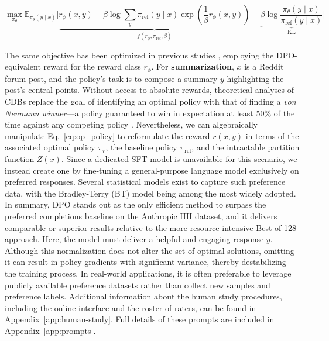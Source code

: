 \begin{equation}\label{eq:AC}
    \max_{\pi_{\theta}}\mathbb{E}_{\pi_{\theta}(y\mid x)}\bigg[\underbrace{r_{\phi}(x, y) -\beta\log\sum_{y}\pi_\text{ref}(y\mid x)\exp\left(\frac{1}{\beta}r_{\phi}(x, y)\right)}_{f(r_{\phi}, \pi_\text{ref}, \beta)} - \underbrace{\beta\log\frac{\pi_{\theta}(y\mid x)}{\pi_\text{ref}(y\mid x)}}_{\text{KL}}\bigg]
\end{equation}

The same objective has been optimized in previous studies 
\citep{ziegler2020finetuning, stiennon2022learning, bai2022training, ouyang2022training}, employing the DPO-equivalent reward for the reward class $r_{\phi}$. For \textbf{summarization}, $x$ is a Reddit forum post, and the policy's task is to compose a summary $y$ highlighting the post’s central points. Without access to absolute rewards, theoretical analyses of CDBs replace the goal of identifying an optimal policy with that of finding a \textit{von Neumann winner}—a policy guaranteed to win in expectation at least 50\% of the time against any competing policy \citep{dudik2015contextual}. Nevertheless, we can algebraically manipulate Eq.~\ref{eq:op_policy} to reformulate the reward $r(x, y)$ in terms of the associated optimal policy $\pi_r$, the baseline policy $\pi_\text{ref}$, and the intractable partition function $Z(x)$. Since a dedicated SFT model is unavailable for this scenario, we instead create one by fine-tuning a general-purpose language model exclusively on preferred responses. Several statistical models exist to capture such preference data, with the Bradley-Terry (BT) model \cite{bradley1952rankanalysis} being among the most widely adopted. In summary, DPO stands out as the only efficient method to surpass the preferred completions baseline on the Anthropic HH dataset, and it delivers comparable or superior results relative to the more resource-intensive Best of 128 approach. Here, the model must deliver a helpful and engaging response $y$. Although this normalization does not alter the set of optimal solutions, omitting it can result in policy gradients with significant variance, thereby destabilizing the training process. In real-world applications, it is often preferable to leverage publicly available preference datasets rather than collect new samples and preference labels. Additional information about the human study procedures, including the online interface and the roster of raters, can be found in Appendix~\ref{app:human-study}. Full details of these prompts are included in Appendix~\ref{app:prompts}. \begin{definition}

\end{definition}
